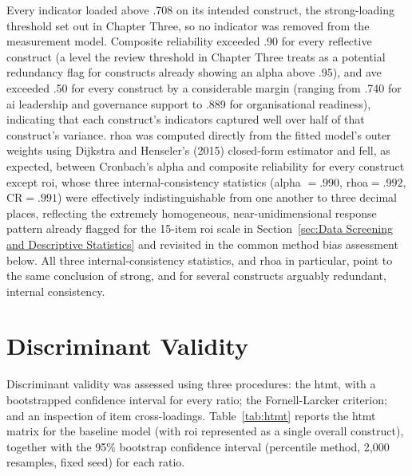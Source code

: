 Every indicator loaded above .708 on its intended construct, the strong-loading threshold set out in Chapter Three, so no indicator was removed from the measurement model. Composite reliability exceeded .90 for every reflective construct (a level the review threshold in Chapter Three treats as a potential redundancy flag for constructs already showing an alpha above .95), and \gls{ave} exceeded .50 for every construct by a considerable margin (ranging from .740 for \gls{ai} leadership and governance support to .889 for organisational readiness), indicating that each construct's indicators captured well over half of that construct's variance. \gls{rhoa} was computed directly from the fitted model's outer weights using Dijkstra and Henseler's (2015) closed-form estimator \autocite{Dijkstra2015} and fell, as expected, between Cronbach's alpha and composite reliability for every construct except \gls{roi}, whose three internal-consistency statistics (alpha $=.990$, \gls{rhoa}$=.992$, CR$=.991$) were effectively indistinguishable from one another to three decimal places, reflecting the extremely homogeneous, near-unidimensional response pattern already flagged for the 15-item \gls{roi} scale in Section~\ref{sec:Data Screening and Descriptive Statistics} and revisited in the common method bias assessment below. All three internal-consistency statistics, and \gls{rhoa} in particular, point to the same conclusion of strong, and for several constructs arguably redundant, internal consistency.

\section{Discriminant Validity}
\label{sec:Discriminant validity}
Discriminant validity was assessed using three procedures: the \gls{htmt}, with a bootstrapped confidence interval for every ratio; the Fornell-Larcker criterion; and an inspection of item cross-loadings. Table~\ref{tab:htmt} reports the \gls{htmt} matrix for the baseline model (with \gls{roi} represented as a single overall construct), together with the 95\% bootstrap confidence interval (percentile method, 2,000 resamples, fixed seed) for each ratio.

